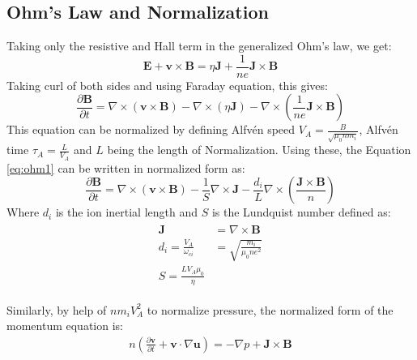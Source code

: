 \documentclass[12pt]{article}
\newenvironment{changemargin}[2]{%
\begin{list}{}{%
\setlength{\topsep}{0pt}%
\setlength{\leftmargin}{#1}%
\setlength{\rightmargin}{#2}%
\setlength{\listparindent}{\parindent}%
\setlength{\itemindent}{\parindent}%
\setlength{\parsep}{\parskip}%
}%
\item[]}{\end{list}}
\begin{document}
\begin{changemargin}{-2cm}{-2cm}
    \subsection{Ohm's Law and Normalization}
    Taking only the resistive and Hall term in the generalized Ohm's law, we get:
    \begin{equation}
        \mathbf{E} + \mathbf{v\times B} = \eta \mathbf{J} + \frac{1}{ne}\mathbf{J\times B}
    \end{equation}
    Taking curl of both sides and using Faraday equation, this gives:
    \begin{equation}\label{eq:ohm1}
        \frac{\partial \mathbf{B}}{\partial t} = \nabla \times \left(\mathbf{v\times B}\right)- \nabla \times (\eta \mathbf{J}) -\nabla \times \left(\frac{1}{ne}\mathbf{J\times B}\right)
    \end{equation}
    This equation can be normalized by defining Alfv\'en speed $V_A = \frac{B}{\sqrt{\mu_0 n m_i}}$, Alfv\'en time $\tau_A = \frac{L}{V_A}$ and $L$ being the length of Normalization. Using these, the Equation \ref{eq:ohm1} can be written in normalized form as:
    \begin{equation}\label{eq:ohm-normal}
        \frac{\partial \mathbf{B}}{\partial t} = \nabla \times \left(\mathbf{v\times B}\right)- \frac{1}{S}\nabla \times \mathbf{J} -\frac{d_i}{L}\nabla \times \left(\frac{\mathbf{J\times B}}{n}\right)
    \end{equation}
    Where $d_i$ is the ion inertial length and $S$ is the Lundquist number defined as:
    \begin{align}
        \begin{split}
            \mathbf{J} &= \nabla \times \mathbf{B}\\
            d_i = \frac{V_A}{\omega_{ci}} &= \sqrt{\frac{m_i}{\mu_0 n e^2}}\\
            S = \frac{LV_A\mu_0}{\eta}
        \end{split}
    \end{align}

    Similarly, by help of $nm_iV_A^2$ to normalize pressure, the normalized form of the momentum equation is:
    \begin{eqnarray}\label{eq:momentum-normal}
        n\left(\frac{\partial \mathbf{v}}{\partial t}+\mathbf{v} \cdot \nabla \mathbf{u} \right) = -\nabla p + \mathbf{J\times B}
    \end{eqnarray}


\end{changemargin}
\end{document}
